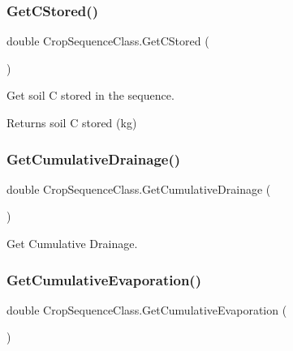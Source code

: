 \subsubsection{\texorpdfstring{GetCStored()}{GetCStored()}}
{\footnotesize\ttfamily double Crop\+Sequence\+Class.\+Get\+C\+Stored (\begin{DoxyParamCaption}{ }\end{DoxyParamCaption})\hspace{0.3cm}{\ttfamily [inline]}}



Get soil C stored in the sequence. 

\begin{DoxyReturn}{Returns}
soil C stored (kg) 
\end{DoxyReturn}
\mbox{\label{class_crop_sequence_class_ad116e8e609a06cfe2786fc329ac904a7}} 
\subsubsection{\texorpdfstring{GetCumulativeDrainage()}{GetCumulativeDrainage()}}
{\footnotesize\ttfamily double Crop\+Sequence\+Class.\+Get\+Cumulative\+Drainage (\begin{DoxyParamCaption}{ }\end{DoxyParamCaption})\hspace{0.3cm}{\ttfamily [inline]}}



Get Cumulative Drainage. 

\mbox{\label{class_crop_sequence_class_a81d03c6e8e88caa6bc03c8829eafa16b}} 
\subsubsection{\texorpdfstring{GetCumulativeEvaporation()}{GetCumulativeEvaporation()}}
{\footnotesize\ttfamily double Crop\+Sequence\+Class.\+Get\+Cumulative\+Evaporation (\begin{DoxyParamCaption}{ }\end{DoxyParamCaption})\hspace{0.3cm}{\ttfamily [inline]}}



